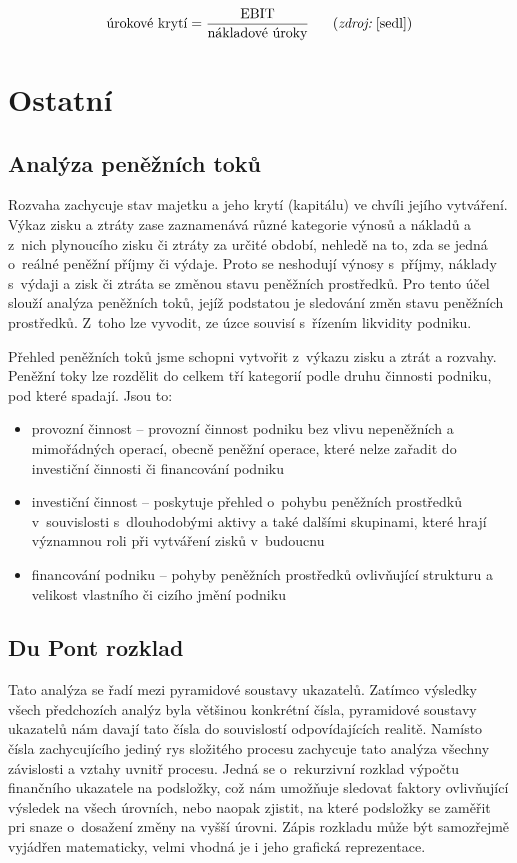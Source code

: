 $$\vz{úrokové krytí}{EBIT}{nákladové úroky} \scite{sedl}$$








\section{Ostatní}

\subsection{Analýza peněžních toků}
Rozvaha zachycuje stav majetku a jeho krytí (kapitálu) ve chvíli jejího vytváření. Výkaz zisku a ztráty zase zaznamenává různé kategorie výnosů a nákladů a z~nich plynoucího zisku či ztráty za určité období, nehledě na to, zda se jedná o~reálné peněžní příjmy či výdaje. Proto se neshodují výnosy s~příjmy, náklady s~výdaji a zisk či ztráta se změnou stavu peněžních prostředků. Pro tento účel slouží analýza peněžních toků, jejíž podstatou je sledování změn stavu peněžních prostředků.\cite{komplex} Z~toho lze vyvodit, ze úzce souvisí s~řízením likvidity podniku.



Přehled peněžních toků jsme schopni vytvořit z~výkazu zisku a ztrát a rozvahy. Peněžní toky lze rozdělit do celkem tří kategorií podle druhu činnosti podniku, pod které spadají. Jsou to:

\begin{itemize}
  \item provozní činnost -- provozní činnost podniku bez vlivu nepeněžních a mimořádných operací, obecně peněžní operace, které nelze zařadit do investiční činnosti či financování podniku
  \item investiční činnost -- poskytuje přehled o~pohybu peněžních prostředků v~souvislosti s~dlouhodobými aktivy a také dalšími skupinami, které hrají významnou roli při vytváření zisků v~budoucnu
  \item financování podniku -- pohyby peněžních prostředků ovlivňující strukturu a velikost vlastního či cizího jmění podniku
\end{itemize}



\subsection{Du Pont rozklad}
Tato analýza se řadí mezi pyramidové soustavy ukazatelů. Zatímco výsledky všech předchozích analýz byla většinou konkrétní čísla, pyramidové soustavy ukazatelů nám davají tato čísla do souvislostí odpovídajících realitě. Namísto čísla zachycujícího jediný rys složitého procesu zachycuje tato analýza všechny závislosti a vztahy uvnitř procesu. Jedná se o~rekurzivní rozklad výpočtu finančního ukazatele na podsložky, což nám umožňuje sledovat faktory ovlivňující výsledek na všech úrovních, nebo naopak zjistit, na které podsložky se zaměřit pri snaze o~dosažení změny na vyšší úrovni. Zápis rozkladu může být samozřejmě vyjádřen matematicky, velmi vhodná je i jeho grafická reprezentace.

